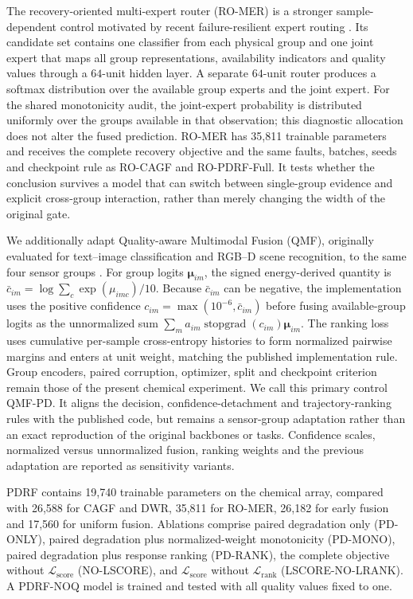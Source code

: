 \documentclass[11pt]{article}
\begin{document}
The recovery-oriented multi-expert router (RO-MER) is a stronger sample-dependent control motivated by recent failure-resilient expert routing \citep{park2025mome}. Its candidate set contains one classifier from each physical group and one joint expert that maps all group representations, availability indicators and quality values through a $64$-unit hidden layer. A separate $64$-unit router produces a softmax distribution over the available group experts and the joint expert. For the shared monotonicity audit, the joint-expert probability is distributed uniformly over the groups available in that observation; this diagnostic allocation does not alter the fused prediction. RO-MER has 35,811 trainable parameters and receives the complete recovery objective and the same faults, batches, seeds and checkpoint rule as RO-CAGF and RO-PDRF-Full. It tests whether the conclusion survives a model that can switch between single-group evidence and explicit cross-group interaction, rather than merely changing the width of the original gate.

We additionally adapt Quality-aware Multimodal Fusion (QMF), originally evaluated for text--image classification and RGB--D scene recognition, to the same four sensor groups \citep{zhang2023qmf}. For group logits $\boldsymbol\mu_{im}$, the signed energy-derived quantity is $\bar c_{im}=\log\sum_c\exp(\mu_{imc})/10$. Because $\bar c_{im}$ can be negative, the implementation uses the positive confidence $c_{im}=\max(10^{-6},\bar c_{im})$ before fusing available-group logits as the unnormalized sum $\sum_m a_{im}\operatorname{stopgrad}(c_{im})\boldsymbol\mu_{im}$. The ranking loss uses cumulative per-sample cross-entropy histories to form normalized pairwise margins and enters at unit weight, matching the published implementation rule. Group encoders, paired corruption, optimizer, split and checkpoint criterion remain those of the present chemical experiment. We call this primary control QMF-PD. It aligns the decision, confidence-detachment and trajectory-ranking rules with the published code, but remains a sensor-group adaptation rather than an exact reproduction of the original backbones or tasks. Confidence scales, normalized versus unnormalized fusion, ranking weights and the previous adaptation are reported as sensitivity variants.

PDRF contains 19,740 trainable parameters on the chemical array, compared with 26,588 for CAGF and DWR, 35,811 for RO-MER, 26,182 for early fusion and 17,560 for uniform fusion. Ablations comprise paired degradation only (PD-ONLY), paired degradation plus normalized-weight monotonicity (PD-MONO), paired degradation plus response ranking (PD-RANK), the complete objective without $\mathcal L_{\mathrm{score}}$ (NO-LSCORE), and $\mathcal L_{\mathrm{score}}$ without $\mathcal L_{\mathrm{rank}}$ (LSCORE-NO-LRANK). A PDRF-NOQ model is trained and tested with all quality values fixed to one.
\end{document}
